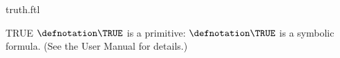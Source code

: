 \documentclass{stex}
\begin{document}
\begin{smodule}{truth.ftl}


\begin{documentation}{TRUE}
  $\defnotation\TRUE$ is a \Naproche primitive:
  $\defnotation\TRUE$ is a symbolic formula.
  (See the \Naproche User Manual for details.)
\end{documentation}

\end{smodule}
\end{document}
